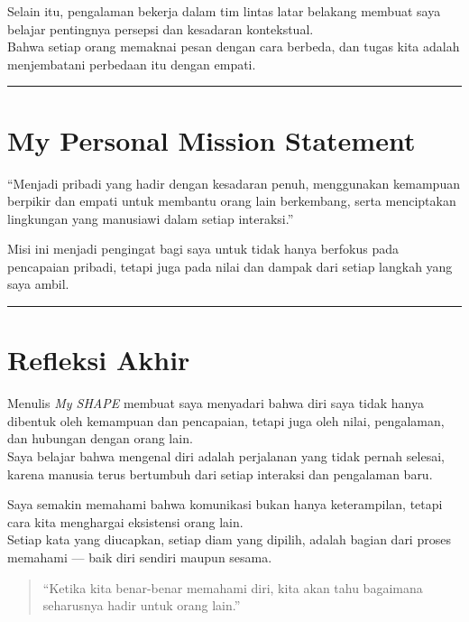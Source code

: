 \documentclass[
  letterpaper,
  DIV=11,
  numbers=noendperiod]{scrreprt}
\begin{document}
Selain itu, pengalaman bekerja dalam tim lintas latar belakang membuat
saya belajar pentingnya persepsi dan kesadaran kontekstual.\\
Bahwa setiap orang memaknai pesan dengan cara berbeda, dan tugas kita
adalah menjembatani perbedaan itu dengan empati.

\begin{center}\rule{0.5\linewidth}{0.5pt}\end{center}

\section{My Personal Mission
Statement}\label{my-personal-mission-statement}

``Menjadi pribadi yang hadir dengan kesadaran penuh, menggunakan
kemampuan berpikir dan empati untuk membantu orang lain berkembang,
serta menciptakan lingkungan yang manusiawi dalam setiap interaksi.''

Misi ini menjadi pengingat bagi saya untuk tidak hanya berfokus pada
pencapaian pribadi, tetapi juga pada nilai dan dampak dari setiap
langkah yang saya ambil.

\begin{center}\rule{0.5\linewidth}{0.5pt}\end{center}

\section{Refleksi Akhir}\label{refleksi-akhir}

Menulis \emph{My SHAPE} membuat saya menyadari bahwa diri saya tidak
hanya dibentuk oleh kemampuan dan pencapaian, tetapi juga oleh nilai,
pengalaman, dan hubungan dengan orang lain.\\
Saya belajar bahwa mengenal diri adalah perjalanan yang tidak pernah
selesai, karena manusia terus bertumbuh dari setiap interaksi dan
pengalaman baru.

Saya semakin memahami bahwa komunikasi bukan hanya keterampilan, tetapi
cara kita menghargai eksistensi orang lain.\\
Setiap kata yang diucapkan, setiap diam yang dipilih, adalah bagian dari
proses memahami --- baik diri sendiri maupun sesama.

\begin{quote}
``Ketika kita benar-benar memahami diri, kita akan tahu bagaimana
seharusnya hadir untuk orang lain.''
\end{quote}
\end{document}
